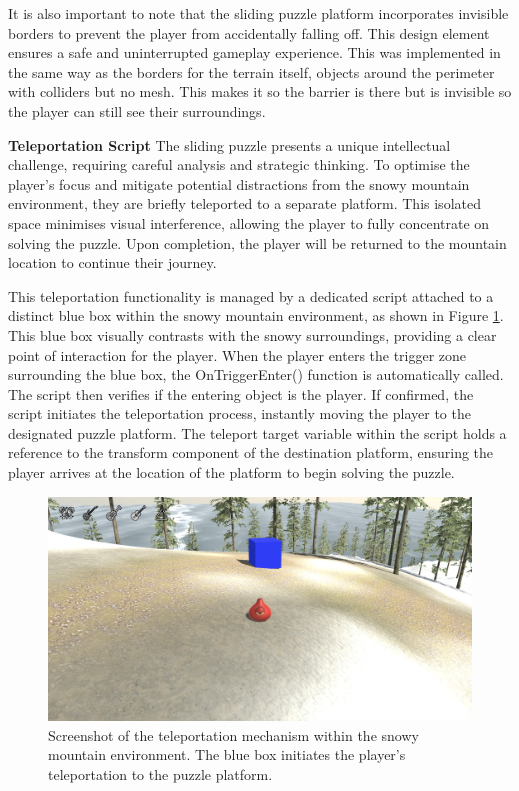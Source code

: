 \documentclass{l4proj}
\begin{document}
It is also important to note that the sliding puzzle platform incorporates invisible borders to prevent the player from accidentally falling off. This design element ensures a safe and uninterrupted gameplay experience. This was implemented in the same way as the borders for the terrain itself, objects around the perimeter with colliders but no mesh. This makes it so the barrier is there but is invisible so the player can still see their surroundings.

\textbf{Teleportation Script} \newline
The sliding puzzle presents a unique intellectual challenge, requiring careful analysis and strategic thinking. To optimise the player's focus and mitigate potential distractions from the snowy mountain environment, they are briefly teleported to a separate platform. This isolated space minimises visual interference, allowing the player to fully concentrate on solving the puzzle. Upon completion, the player will be returned to the mountain location to continue their journey.

This teleportation functionality is managed by a dedicated script attached to a distinct blue box within the snowy mountain environment, as shown in Figure \ref{fig:teleportation}. This blue box visually contrasts with the snowy surroundings, providing a clear point of interaction for the player. When the player enters the trigger zone surrounding the blue box, the OnTriggerEnter() function is automatically called. The script then verifies if the entering object is the player. If confirmed, the script initiates the teleportation process, instantly moving the player to the designated puzzle platform. The teleport target variable within the script holds a reference to the transform component of the destination platform, ensuring the player arrives at the location of the platform to begin solving the puzzle.

\begin{figure}[h]
  \centering
  \includegraphics[width=0.7\linewidth]{dissertation/images/Sliding_Teleport.png} 
  \caption{Screenshot of the teleportation mechanism within the snowy mountain environment. The blue box initiates the player's teleportation to the puzzle platform.} 
  \label{fig:teleportation} 
\end{figure}
\end{document}
